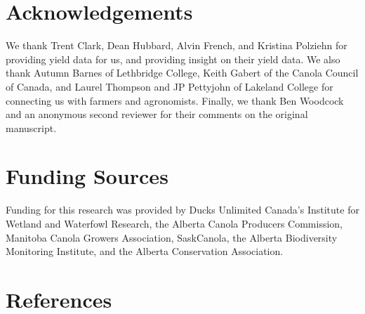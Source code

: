 \documentclass[]{elsarticle} %
\begin{document}
\hypertarget{acknowledgements}{%
\section{Acknowledgements}\label{acknowledgements}}

We thank Trent Clark, Dean Hubbard, Alvin French, and Kristina Polziehn for providing yield data for us, and providing insight on their yield data.
We also thank Autumn Barnes of Lethbridge College, Keith Gabert of the Canola Council of Canada, and Laurel Thompson and JP Pettyjohn of Lakeland College for connecting us with farmers and agronomists.
Finally, we thank Ben Woodcock and an anonymous second reviewer for their comments on the original manuscript.

\hypertarget{funding-sources}{%
\section{Funding Sources}\label{funding-sources}}

Funding for this research was provided by Ducks Unlimited Canada's Institute for Wetland and Waterfowl Research, the Alberta Canola Producers Commission, Manitoba Canola Growers Association, SaskCanola, the Alberta Biodiversity Monitoring Institute, and the Alberta Conservation Association.

\hypertarget{references}{%
\section*{References}\label{references}}
\end{document}
